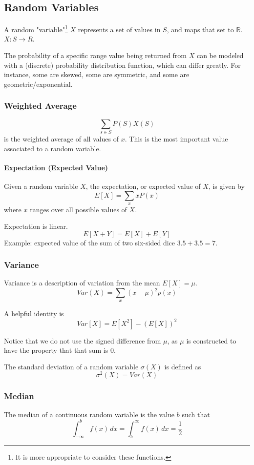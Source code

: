 \documentclass{article}
\begin{document}
\subsection{Random Variables}
A random "variable"\footnote{It is more appropriate to consider these functions.} $X$ represents a set of values in $S$, and maps that set to $\mathbb{R}$.  $X: S \to R$.

The probability of a specific range value being returned from $X$ can be modeled with a (discrete) probability distribution function, which can differ greatly.
For instance, some are skewed, some are symmetric, and some are geometric/exponential.

\subsubsection{Weighted Average} \label{expected}
$$\sum_{s \in S} P(S)X(S)$$ is the weighted average of all values of $x$. This is the most important value associated to a random variable.

\paragraph{Expectation (Expected Value)} Given a random variable $X$, the expectation, or expected value of $X$, is given by
$$E\left[X\right]=\sum_x xP(x)$$ where $x$ ranges over all possible values of $X$.

Expectation is linear. $$E\left[X+Y\right] = E\left[X\right] + E\left[Y\right]$$
Example: expected value of the sum of two six-sided dice $3.5 + 3.5 = 7$.

\subsubsection{Variance} \label{variance}
Variance is a description of variation from the mean $E[X] = \mu$.
$$Var(X) = \sum_x\left(x-\mu\right)^2p(x)$$

A helpful identity is  $$Var[X] = E[X^2] - \left(E[X]\right)^2$$

Notice that we do not use the signed difference from $\mu$, as $\mu$ is constructed to have the property that that sum is $0$.

The standard deviation of a random variable $\sigma(X)$ is defined as
$$\sigma^2(X) = Var(X)$$

\subsubsection{Median}
The median of a continuous random variable is the value $b$ such that
$$\int_{-\infty}^b f(x)\,dx = \int_b^\infty f(x)\,dx = \frac{1}{2}$$
\end{document}
